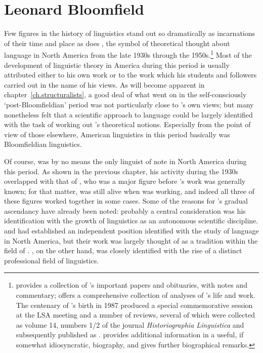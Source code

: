 \chapter{Leonard Bloomfield}
\label{ch.bloomfield}

Few figures in the history of linguistics stand out so dramatically as
incarnations of their time and place as does , the
symbol of theoretical thought about language in North America from the
late 1930s through the
1950s.\footnote{\citet{hockett70:bloomfield.anthology} provides a
  collection of {\Bloomfield}'s important papers and obituaries, with
  notes and commentary; \citet{fought99:bloomfield} offers a
  comprehensive collection of analyses of {\Bloomfield}'s life and
  work. The centenary of {\Bloomfield}'s birth in 1987 produced a special
  commemorative session at the LSA meeting and a number of reviews,
  several of which were collected as volume 14, numbers 1/2 of the
  journal \textsl{Historiographia Linguistica} and subsequently
  published as
  \citealt{hall87:bloomfield.essays}. \citet{hall90:bloomfield.bio}
  provides additional information in a useful, if somewhat
  idiosyncratic, biography, and \citet{hockett99:bloomfield.bio} gives
  further biographical remarks.}  Most of the development of
linguistic theory in America during this period is usually attributed
either to his own work or to the work which his students and followers
carried out in the name of his views. As will become apparent in
chapter~\ref{ch.structuralists}, a good deal of what went on in the
self-consciously `post-Bloomfieldian' period was not particularly
close to {\Bloomfield}'s own views; but many nonetheless felt that a
scientific approach to language could be largely identified with the
task of working out {\Bloomfield}'s theoretical notions. Especially from
the point of view of those elsewhere, American linguistics in this
period basically was Bloomfieldian linguistics.

Of course, {\Bloomfield} was by no means the only linguist of note in
North America during this period.  As shown in the previous chapter,
his activity during the 1930s overlapped with that of {\Sapir}, who was a
major figure before {\Bloomfield}'s work was generally known; for that
matter, {\Boas} was still alive when {\Bloomfield} was working, and indeed
all three of these figures worked together in some cases. Some of the
reasons for {\Bloomfield}'s gradual ascendancy have already been noted:
probably a central consideration was his identification with the
growth of linguistics as an autonomous scientific discipline. {\Boas} and
{\Sapir} had established an independent position identified with the
study of language in North America, but their work was largely thought
of as a tradition within the field of . {\Bloomfield}, on the
other hand, was closely identified with the rise of a distinct
professional field of linguistics.

